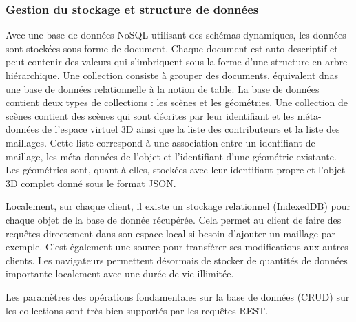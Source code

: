 \subsubsection{Gestion du stockage et structure de données}

Avec une base de données NoSQL utilisant des schémas dynamiques, les 
données sont stockées sous forme de document. Chaque document est 
auto-descriptif et peut contenir des valeurs qui s'imbriquent sous la forme d'une 
structure en arbre hiérarchique. Une collection consiste à grouper des documents, 
équivalent dnas une base de données relationnelle à la notion de table. La base de 
données contient deux types de collections : les scènes et les géométries. Une 
collection de scènes contient des scènes qui sont décrites par leur identifiant et 
les méta-données de l'espace virtuel 3D ainsi que la liste des contributeurs et la 
liste des maillages. Cette liste correspond à une association entre un identifiant de 
maillage, les méta-données de l'objet et l'identifiant d'une géométrie existante. 
Les géométries sont, quant à elles, stockées avec leur identifiant propre et l'objet 
3D complet donné sous le format \gls{JSON}.

Localement, sur chaque client, il existe un stockage relationnel (IndexedDB) pour 
chaque objet de la base de donnée récupérée. Cela permet au client de faire des 
requêtes directement dans son espace local si besoin d'ajouter un maillage par 
exemple. 
C'est également une source pour transférer ses modifications aux autres clients.
Les navigateurs permettent désormais de stocker de quantités de données 
importante localement avec une durée de vie illimitée. 

Les paramètres des opérations fondamentales sur la base de données 
(\gls{CRUD}) sur les collections sont très bien supportés par les requêtes 
\gls{REST}.


